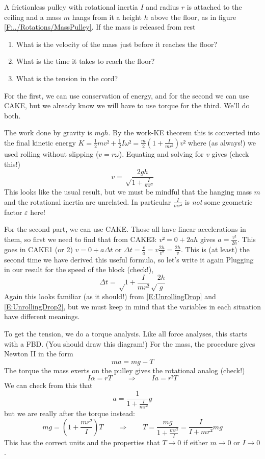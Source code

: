 \begin{example}
A frictionless pulley with rotational inertia $I$ and radius $r$ is attached to the ceiling and a mass $m$ hangs from it a height $h$ above the floor, as in figure \ref{F:../Rotations/MassPulley}. If the mass is released from rest
\begin{enumerate}
\item What is the velocity of the mass just before it reaches the floor?
\item What is the time it takes to reach the floor?
\item What is the tension in the cord? 
\end{enumerate}
\begin{solution}
For the first, we can use conservation of energy, and for the second we can use CAKE, but we already know we will have to use torque for the third. We'll do both. 

The work done by gravity is $mgh$. By the work-KE theorem this is converted into the final kinetic energy $K= \frac12 mv² + \frac12 Iω² = \frac m2\left( 1 +\frac I{mr²}\right) v²$ where (as always!) we used rolling without slipping ($v=rω$). Equating and solving for $v$ gives (check this!)
$$
v = √{\frac{2gh}{1 +\frac I{mr²}}}
$$
This looks like the usual result, but we must be mindful that the hanging mass $m$ and the rotational inertia are unrelated. In particular $\frac I{mr²}$ is {\em not} some geometric factor $ε$ here!

For the second part, we can use CAKE. Those all have linear accelerations in them, so first we need to find that from CAKE3: $v² = 0 + 2a h$ gives $a =\frac{v²}{2h}$. This goes in CAKE1 (or 2) $v=0+a Δt$ or $Δt= \frac va = v\frac{2h}{v²} = \frac{2h}{v}$. This is (at least) the second time we have derived this useful formula, so let's write it again 
Plugging in our result for the speed of the block (check!), 
$$
Δt %
	= √ {1 +\frac I{mr²}} √ \frac{2h}{g}
$$
Again this looks familiar (as it should!) from \eqref{E:UnrollingDrop} and \eqref{E:UnrollingDrop2}, but we must keep in mind that the variables in each situation have different meanings. 

To get the tension, we do a torque analysis. Like all force analyses, this starts with a FBD. (You should draw this diagram!) For the mass, the procedure gives Newton II in the form
$$
ma = mg -T
$$
The torque the mass exerts on the pulley gives the rotational analog (check!)
$$
I α = r T
\quad \quad ⇒ \quad \quad
I a = r²T
$$
We can check from this that 
$$
a= \frac {1}{ 1 + \frac I{mr²} } g
$$
but we are really after the torque instead:
$$
mg = \left( 1+ \frac{mr²}I \right) T
\quad \quad ⇒ \quad \quad
T = \frac {mg}{ 1+ \frac{mr²}I } =  \frac {I}{ I + mr² } mg
$$
This has the correct units and the properties that $T→ 0$ if either $m→ 0$ or $I→ 0$. 
\end{solution}
\end{example}

